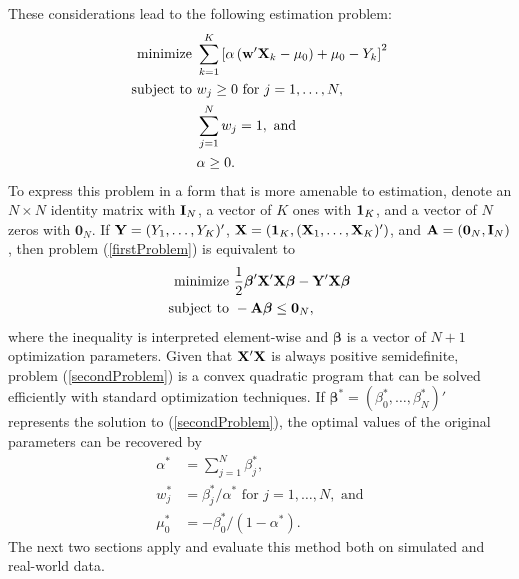 \documentclass[11pt]{article}
\theoremstyle{definition}
\theoremstyle{definition}
\def\one{{\bf 1}}
\def\w{{\bf w}}
\def\A{{\bf A}}
\def\X{{\bf X}}
\def\Y{{\bf Y}}
\def\Beta{\boldsymbol{\beta}}
\def\I{{\bf I}}
\begin{document}
These considerations lead to the following estimation problem:
\begin{align}
 \label{firstProblem}
 \begin{split}
\text{minimize } & \sum_{k=1}^K \left[ \alpha  \left(  \w'\X_{k} - \mu_0\right) + \mu_0 - Y_k \right]^2\\
\text{subject to } & w_j \geq 0 \text{ for } j = 1, \dots, N,\\
& \sum_{j=1}^N w_j = 1, \text{ and }\\
& \alpha \geq 0.
\end{split}
\end{align}
To express this problem in a form that is more amenable to estimation, denote an $N \times N$ identity matrix with $\I_N$,  a vector of $K$ ones with $\one_K$, and a vector of $N$ zeros with $\boldsymbol{0}_N$. If $\Y = (Y_1, \dots, Y_K)'$, $\X = (\one_K, (\X_1, \dots, \X_K)')$, and $\A = (\boldsymbol{0}_N, \I_N)$, then  problem (\ref{firstProblem}) is equivalent to
\begin{align}
 \label{secondProblem}
 \begin{split}
\text{minimize } & \frac{1}{2} \Beta' \X'\X \Beta - \Y'\X\Beta\\
\text{subject to } & -\A\Beta \leq \boldsymbol{0}_N,
\end{split}
\end{align}
where the inequality is interpreted element-wise and $\Beta$ is a vector of $N+1$ optimization parameters. Given that $\X'\X$ is always positive semidefinite, problem (\ref{secondProblem}) is a convex quadratic program that can be solved efficiently with standard optimization techniques. 
 If $\Beta^* = (\beta_0^*, \dots, \beta_{N}^*)'$ represents the solution to (\ref{secondProblem}), the optimal values of the original parameters can be recovered by
\begin{align*}
\alpha^* &= \sum_{j=1}^N \beta_j^*,\\
w_j^* &=  \beta_j^*/\alpha^* \text{ for } j = 1, \dots, N, \text{ and}\\
\mu_0^* &= -\beta_0^*/(1-\alpha^*).
\end{align*}
The next two sections apply and evaluate this method both on simulated and real-world data. 
\end{document}
